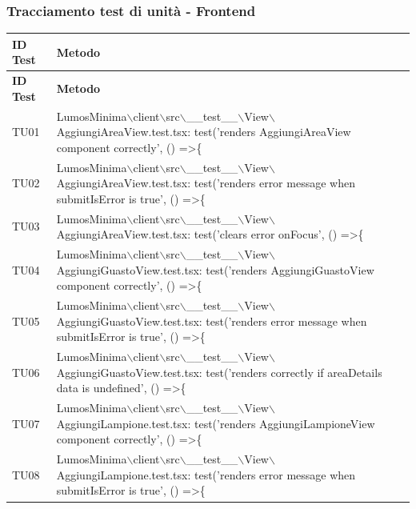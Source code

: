 \documentclass[12pt]{article}
\begin{document}
\subsubsection{Tracciamento test di unità - Frontend}
\begin{scriptsize}
\begin{xltabular}{\linewidth}{|>{\hsize}X|X|}

	\hline
	\textbf{ID Test} & \textbf{Metodo} \\
	\hline
	\endfirsthead
	\hline
	\textbf{ID Test} & \textbf{Metodo} \\
	\hline
	\endhead
	\hline
	TU01 & LumosMinima$\backslash$client$\backslash$src$\backslash$\_\_test\_\_$\backslash$View$\backslash$AggiungiAreaView.test.tsx: test('renders AggiungiAreaView component correctly', () =\textgreater \{ \\ \hline
	TU02 & LumosMinima$\backslash$client$\backslash$src$\backslash$\_\_test\_\_$\backslash$View$\backslash$AggiungiAreaView.test.tsx: test('renders error message when submitIsError is true', () =\textgreater \{ \\ \hline
	TU03 & LumosMinima$\backslash$client$\backslash$src$\backslash$\_\_test\_\_$\backslash$View$\backslash$AggiungiAreaView.test.tsx: test('clears error onFocus', () =\textgreater \{ \\ \hline
	TU04 & LumosMinima$\backslash$client$\backslash$src$\backslash$\_\_test\_\_$\backslash$View$\backslash$AggiungiGuastoView.test.tsx: test('renders AggiungiGuastoView component correctly', () =\textgreater \{ \\ \hline
	TU05 & LumosMinima$\backslash$client$\backslash$src$\backslash$\_\_test\_\_$\backslash$View$\backslash$AggiungiGuastoView.test.tsx: test('renders error message when submitIsError is true', () =\textgreater \{ \\ \hline
	TU06 & LumosMinima$\backslash$client$\backslash$src$\backslash$\_\_test\_\_$\backslash$View$\backslash$AggiungiGuastoView.test.tsx: test('renders correctly if areaDetails data is undefined', () =\textgreater \{ \\ \hline
	TU07 & LumosMinima$\backslash$client$\backslash$src$\backslash$\_\_test\_\_$\backslash$View$\backslash$AggiungiLampione.test.tsx: test('renders AggiungiLampioneView component correctly', () =\textgreater \{ \\ \hline
	TU08 & LumosMinima$\backslash$client$\backslash$src$\backslash$\_\_test\_\_$\backslash$View$\backslash$AggiungiLampione.test.tsx: test('renders error message when submitIsError is true', () =\textgreater \{ \\ \hline

\end{xltabular}
\end{scriptsize}
\end{document}
